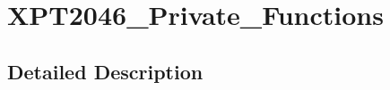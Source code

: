 \hypertarget{group___x_p_t2046___private___functions}{}\section{X\+P\+T2046\+\_\+\+Private\+\_\+\+Functions}
\label{group___x_p_t2046___private___functions}


\subsection{Detailed Description}
